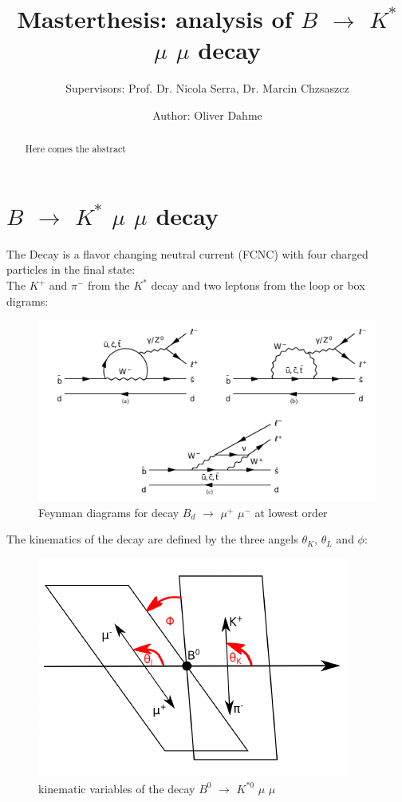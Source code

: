 \documentclass[english]{uzhpub}
\begin{document}
\title{Masterthesis: analysis of $B$ $\rightarrow$ $K^{*}$ $\mu$ $\mu$ decay}

\subtitle{Supervisors: Prof. Dr. Nicola Serra, Dr. Marcin Chzsaszcz}

\author{Author: Oliver Dahme}


\maketitle




\begin{abstract}
  Here comes the abstract
\end{abstract}



\section{$B$ $\rightarrow$ $K^{*}$ $\mu$ $\mu$ decay}
The Decay is a flavor changing neutral current (FCNC) with four charged particles in the final state: \\
The $K^+$ and $\pi^-$ from the $K^{*}$ decay and two leptons from the loop or box digrams:
\begin{figure}[H]
  \centering
  \includegraphics[width=0.8\linewidth]{KstarFeynman}
  \caption{Feynman diagrams for decay $B_d$ $\rightarrow$ $\mu^+$ $\mu^-$ at lowest order}
  \label{fig:Feynman}
\end{figure}
The kinematics of the decay are defined by the three angels $\theta_K$, $\theta_L$ and $\phi$:
\begin{figure}[H]
  \centering
  \includegraphics[width=0.6\linewidth]{angels}
  \caption{kinematic variables of the decay $B^0$ $\rightarrow$ $K^{*0}$ $\mu$ $\mu$}
  \label{fig:angels}
\end{figure}
\end{document}
